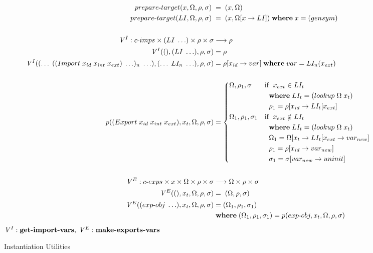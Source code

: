 \documentclass[sigplan,screen,anonymous]{acmart}
\def\dash {\text{-}}
\begin{document}
\begin{figure}[tbp]
  \begin{align*}
    prepare\dash target(x, \Omega, \rho, \sigma)\; &=\; (x, \Omega) \\
    prepare\dash target(LI, \Omega, \rho, \sigma)\; &=\; (x, \Omega[x\rightarrow LI])\; \where x = (gensym) \\ \\
    \mathit{V}^I : c\dash imps \times (LI\;\ldots) \times \rho \times \sigma &\longrightarrow \rho \\
    \mathit{V}^I((), (LI\;\ldots), \rho, \sigma) &= \rho \\
    \mathit{V}^I((\ldots\;((Import\; x_{id}\;x_{int}\;x_{ext})\;\ldots)_n\;\ldots), (\ldots\;LI_n\;\ldots), \rho, \sigma) &= \rho[x_{id}\rightarrow var]\; \where var = LI_n(x_{ext}) \\ \\
    p((Export\;x_{id}\;x_{int}\;x_{ext}), x_t, \Omega, \rho, \sigma) &= \begin{cases*}
      \Omega, \rho_1, \sigma & if $\;x_{ext} \in LI_t$ \\
      \;        &\; \where $LI_t = (lookup\; \Omega\; x_t)$ \\
      \;        &\; $\rho_1 = \rho[x_{id}\rightarrow LI_t[x_{ext}]$ \\
        \Omega_1, \rho_1, \sigma_1 & if $\;x_{ext} \notin LI_t$\\
        \;        &\; \where $LI_t = (lookup\; \Omega\; x_t)$ \\
        \;        &\; $\Omega_1 = \Omega[x_t\rightarrow LI_t[x_{ext}\rightarrow var_{new}]$ \\
        \;        &\; $\rho_1 = \rho[x_{id}\rightarrow var_{new}]$ \\
        \;        &\; $\sigma_1 = \sigma[var_{new}\rightarrow uninit]$ \\
    \end{cases*} \\ \\
    \mathit{V}^E : c\dash exps \times x \times \Omega \times \rho \times \sigma &\longrightarrow \Omega \times \rho \times \sigma \\
    \mathit{V}^E((), x_t, \Omega, \rho, \sigma) &=\; (\Omega, \rho, \sigma) \\
    \mathit{V}^E((exp\dash obj\;\ldots), x_t, \Omega, \rho, \sigma) &= (\Omega_1, \rho_1, \sigma_1)\\
    \;        &\; \where (\Omega_1, \rho_1, \sigma_1) = p(exp\dash obj, x_t, \Omega, \rho, \sigma) \\
  \end{align*}
  $\mathit{V}^I : \textbf{get\dash import\dash vars},\: \mathit{V}^E : \textbf{make\dash exports\dash vars}$
\caption{Instantiation Utilities}
\label{fig:inst-utils}
\end{figure}
\end{document}

